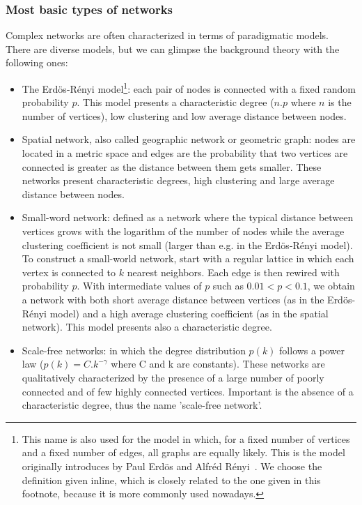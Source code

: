 \subsubsection{Most basic types of networks}
Complex networks are often characterized in terms of paradigmatic models.
There are diverse models, but we can glimpse the background theory
with the following ones:
\begin{itemize}
	\item The Erdös-Rényi model\footnote{This name is also used for the model in which, for a fixed number of vertices and a fixed number of edges, all graphs are equally likely. This is the model originally introduces by Paul Erdös and Alfréd Rényi~\cite{erdosOrig}.
		We choose the definition given inline, which is closely related to the one given in this footnote, because it is more commonly used nowadays.}: each pair of nodes is connected with a fixed random probability $p$.
		This model presents a characteristic degree ($n.p$ where $n$ is the number of vertices), low clustering and low average distance between nodes.
	\item Spatial network, also called geographic network or geometric graph: nodes are located in a metric space and edges are the probability that two vertices are connected is greater as the distance between them gets smaller. These networks present characteristic degrees, high clustering and large average distance between nodes.
	\item Small-word network: defined as a network where the typical distance between vertices grows with the logarithm of the number of nodes while the average clustering coefficient is not small (larger than e.g. in the Erdös-Rényi model).
		To construct a small-world network, start with a regular lattice in which each vertex is connected to $k$ nearest neighbors.
		Each edge is then rewired with probability $p$.
		With intermediate values of $p$ such as $0.01<p<0.1$, we obtain a network with both short average distance between vertices (as in the Erdös-Rényi model) and a high average clustering coefficient (as in the spatial network).
		This model presents also a characteristic degree.
	\item Scale-free networks: in which the degree distribution $p(k)$ follows a power law ($p(k)=C.k^{-\gamma}$ where C and k are constants).
		These networks are qualitatively characterized by the presence of a large number of poorly connected and of few highly connected vertices.
		Important is the absence of a characteristic degree, thus the name 'scale-free network'.
\end{itemize}

